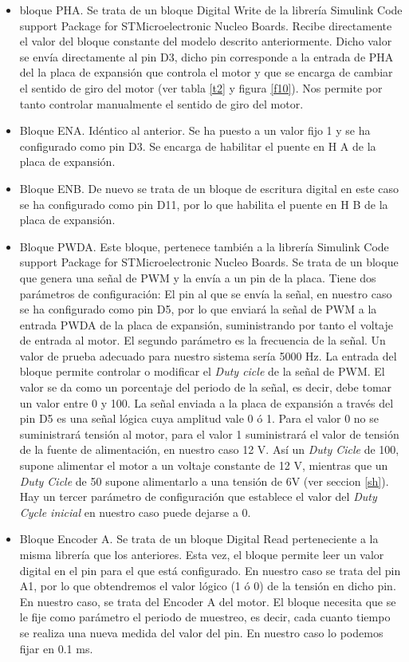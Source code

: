 \documentclass[10pt,a4paper]{report}
\begin{document}
\begin{itemize}
\item bloque PHA. Se trata de un bloque Digital Write de la librería Simulink Code support Package for STMicroelectronic Nucleo Boards. Recibe directamente el valor del bloque constante del modelo descrito anteriormente. Dicho valor se envía directamente al pin D3, dicho pin corresponde a la entrada de PHA del la placa de expansión que controla el motor y que se encarga de cambiar el sentido de giro del motor (ver tabla \ref{t2} y figura \ref{f10}). Nos permite por tanto controlar manualmente el sentido de giro del motor.
\item Bloque ENA. Idéntico al anterior. Se ha puesto a un valor fijo 1 y se ha configurado como pin D3. Se encarga de habilitar el puente en H A de la placa de expansión.
\item Bloque ENB. De nuevo se trata de un bloque de escritura digital en este caso se ha configurado como pin D11, por lo que habilita el puente en H B de la placa de expansión.
\item Bloque PWDA. Este bloque, pertenece también a la librería Simulink Code support Package for STMicroelectronic Nucleo Boards. Se trata de un bloque que genera una señal de PWM y la envía a un pin de la placa. Tiene dos parámetros de configuración: El pin al que se envía la señal, en nuestro caso se ha configurado como pin D5, por lo que enviará la señal de PWM a la entrada PWDA de la placa de expansión, suministrando por tanto el voltaje de entrada al motor. El segundo parámetro es la frecuencia de la señal. Un valor de prueba adecuado para nuestro sistema sería 5000 Hz. La entrada del bloque permite controlar o modificar el \emph{Duty cicle} de la señal de PWM. El valor se da como un porcentaje del periodo de la señal, es decir, debe tomar un valor entre 0 y 100. La señal enviada a la placa de expansión a través del pin D5 es una señal lógica cuya amplitud vale 0 ó 1. Para el valor 0 no se suministrará tensión al motor, para el valor 1 suministrará el valor de tensión de la fuente de alimentación, en nuestro caso 12 V. Así un \emph{Duty Cicle} de 100, supone alimentar el motor a un voltaje constante de 12 V, mientras que un \emph{Duty Cicle} de 50 supone alimentarlo a una tensión de 6V (ver seccion \ref{sh}). Hay un tercer parámetro de configuración que establece el valor del \emph{Duty Cycle inicial} en nuestro caso puede dejarse a 0.

\item Bloque Encoder A. Se trata de un bloque Digital Read perteneciente a la misma librería que los anteriores. Esta vez, el bloque permite leer un valor digital en el pin para el que está configurado. En nuestro caso se trata del pin A1, por lo que obtendremos el valor lógico (1 ó 0) de la tensión en dicho pin. En nuestro caso, se trata del Encoder A  del motor. El bloque necesita que se le fije como parámetro el periodo de muestreo, es decir, cada cuanto tiempo se realiza una nueva medida del valor del pin.  En nuestro caso lo podemos fijar en 0.1 ms.


\end{itemize}
\end{document}
